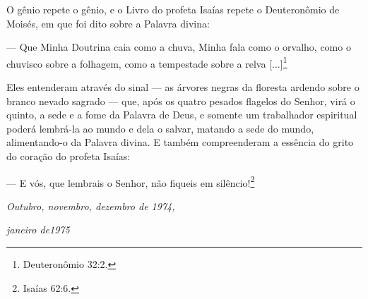 O gênio repete o gênio, e o Livro do profeta Isaías repete o
Deuteronômio de Moisés, em que foi dito sobre a Palavra divina:

--- Que Minha Doutrina caia como a chuva, Minha fala como o orvalho,
como o chuvisco sobre a folhagem, como a tempestade sobre a relva
{[}...{]}\footnote{Deuteronômio 32:2.}

Eles entenderam através do sinal --- as árvores negras da floresta
ardendo sobre o branco nevado sagrado --- que, após os quatro pesados
flagelos do Senhor, virá o quinto, a sede e a fome da Palavra de Deus, e
somente um trabalhador espiritual poderá lembrá-la ao mundo e dela o
salvar, matando a sede do mundo, alimentando-o da Palavra divina. E
também compreenderam a essência do grito do coração do profeta Isaías:

--- E vós, que lembrais o Senhor, não fiqueis em silêncio!\footnote{Isaías
  62:6.}

\emph{Outubro, novembro, dezembro de 1974,}

\emph{janeiro de1975}
